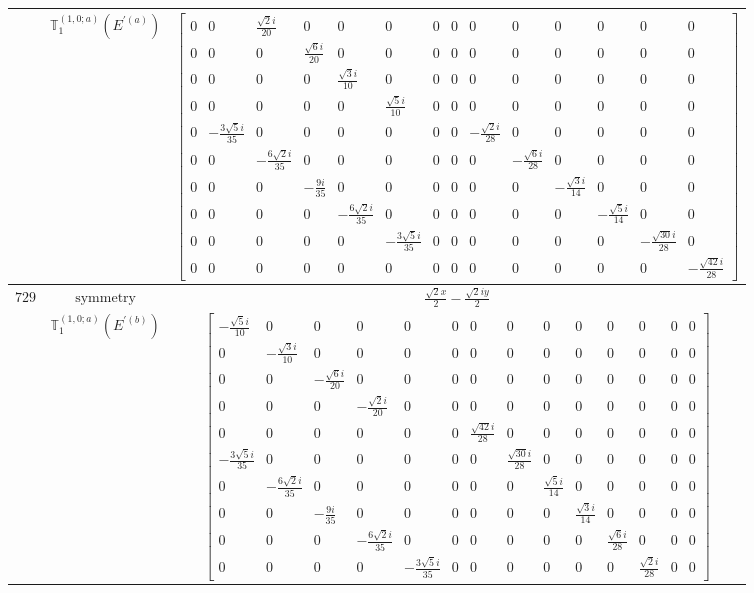 \documentclass[fleqn,8pt,landscape]{jsarticle}
\begin{document}
\begin{longtable}{ccc}
$  $ & $ \mathbb{T}_{1}^{(1,0;a)}(E^{\prime(a)}) $ & $ \begin{bmatrix} 0 & 0 & \frac{\sqrt{2} i}{20} & 0 & 0 & 0 & 0 & 0 & 0 & 0 & 0 & 0 & 0 & 0 \\ 0 & 0 & 0 & \frac{\sqrt{6} i}{20} & 0 & 0 & 0 & 0 & 0 & 0 & 0 & 0 & 0 & 0 \\ 0 & 0 & 0 & 0 & \frac{\sqrt{3} i}{10} & 0 & 0 & 0 & 0 & 0 & 0 & 0 & 0 & 0 \\ 0 & 0 & 0 & 0 & 0 & \frac{\sqrt{5} i}{10} & 0 & 0 & 0 & 0 & 0 & 0 & 0 & 0 \\ 0 & - \frac{3 \sqrt{5} i}{35} & 0 & 0 & 0 & 0 & 0 & 0 & - \frac{\sqrt{2} i}{28} & 0 & 0 & 0 & 0 & 0 \\ 0 & 0 & - \frac{6 \sqrt{2} i}{35} & 0 & 0 & 0 & 0 & 0 & 0 & - \frac{\sqrt{6} i}{28} & 0 & 0 & 0 & 0 \\ 0 & 0 & 0 & - \frac{9 i}{35} & 0 & 0 & 0 & 0 & 0 & 0 & - \frac{\sqrt{3} i}{14} & 0 & 0 & 0 \\ 0 & 0 & 0 & 0 & - \frac{6 \sqrt{2} i}{35} & 0 & 0 & 0 & 0 & 0 & 0 & - \frac{\sqrt{5} i}{14} & 0 & 0 \\ 0 & 0 & 0 & 0 & 0 & - \frac{3 \sqrt{5} i}{35} & 0 & 0 & 0 & 0 & 0 & 0 & - \frac{\sqrt{30} i}{28} & 0 \\ 0 & 0 & 0 & 0 & 0 & 0 & 0 & 0 & 0 & 0 & 0 & 0 & 0 & - \frac{\sqrt{42} i}{28} \end{bmatrix} $ \\ \hline
$ 729 $ & $ \text{symmetry} $ & $ \frac{\sqrt{2} x}{2} - \frac{\sqrt{2} i y}{2} $ \\
$  $ & $ \mathbb{T}_{1}^{(1,0;a)}(E^{\prime(b)}) $ & $ \begin{bmatrix} - \frac{\sqrt{5} i}{10} & 0 & 0 & 0 & 0 & 0 & 0 & 0 & 0 & 0 & 0 & 0 & 0 & 0 \\ 0 & - \frac{\sqrt{3} i}{10} & 0 & 0 & 0 & 0 & 0 & 0 & 0 & 0 & 0 & 0 & 0 & 0 \\ 0 & 0 & - \frac{\sqrt{6} i}{20} & 0 & 0 & 0 & 0 & 0 & 0 & 0 & 0 & 0 & 0 & 0 \\ 0 & 0 & 0 & - \frac{\sqrt{2} i}{20} & 0 & 0 & 0 & 0 & 0 & 0 & 0 & 0 & 0 & 0 \\ 0 & 0 & 0 & 0 & 0 & 0 & \frac{\sqrt{42} i}{28} & 0 & 0 & 0 & 0 & 0 & 0 & 0 \\ - \frac{3 \sqrt{5} i}{35} & 0 & 0 & 0 & 0 & 0 & 0 & \frac{\sqrt{30} i}{28} & 0 & 0 & 0 & 0 & 0 & 0 \\ 0 & - \frac{6 \sqrt{2} i}{35} & 0 & 0 & 0 & 0 & 0 & 0 & \frac{\sqrt{5} i}{14} & 0 & 0 & 0 & 0 & 0 \\ 0 & 0 & - \frac{9 i}{35} & 0 & 0 & 0 & 0 & 0 & 0 & \frac{\sqrt{3} i}{14} & 0 & 0 & 0 & 0 \\ 0 & 0 & 0 & - \frac{6 \sqrt{2} i}{35} & 0 & 0 & 0 & 0 & 0 & 0 & \frac{\sqrt{6} i}{28} & 0 & 0 & 0 \\ 0 & 0 & 0 & 0 & - \frac{3 \sqrt{5} i}{35} & 0 & 0 & 0 & 0 & 0 & 0 & \frac{\sqrt{2} i}{28} & 0 & 0 \end{bmatrix} $ \\ \hline

\end{longtable}
\end{document}
